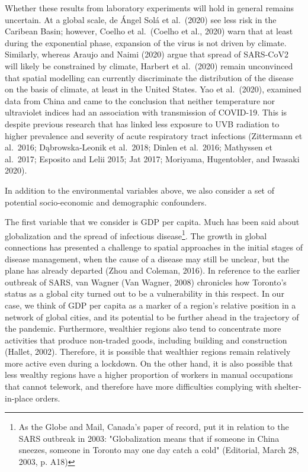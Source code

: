 \documentclass[]{elsarticle} %
\begin{document}
Whether these results from laboratory experiments will hold in general
remains uncertain. At a global scale, de Ángel Solá et al.~(2020) see
less risk in the Caribean Basin; however, Coelho et al.~(Coelho et al.,
2020) warn that at least during the exponential phase, expansion of the
virus is not driven by climate. Similarly, whereas Araujo and Naimi
(2020) argue that spread of SARS-CoV2 will likely be constrained by
climate, Harbert et al.~(2020) remain unconvinced that spatial modelling
can currently discriminate the distribution of the disease on the basis
of climate, at least in the United States. Yao et al.~(2020), examined
data from China and came to the conclusion that neither temperature nor
ultraviolet indices had an association with transmission of COVID-19.
This is despite previous research that has linked less exposure to UVB
radiation to higher prevalence and severity of acute respiratory tract
infections (Zittermann et al.~2016; Dąbrowska-Leonik et al.~2018; Dinlen
et al.~2016; Mathyssen et al.~2017; Esposito and Lelii 2015; Jat 2017;
Moriyama, Hugentobler, and Iwasaki 2020).

In addition to the environmental variables above, we also consider a set
of potential socio-economic and demographic confounders.

The first variable that we consider is GDP per capita. Much has been
said about globalization and the spread of infectious
disease\footnote{As the Globe and Mail, Canada's paper of record, put it in relation to the SARS outbreak in 2003: "Globalization means that if someone in China sneezes, someone in Toronto may one day catch a cold" (Editorial, March 28, 2003, p. A18)}.
The growth in global connections has presented a challenge to spatial
approaches in the initial stages of disease management, when the cause
of a disease may still be unclear, but the plane has already departed
(Zhou and Coleman, 2016). In reference to the earlier outbreak of SARS,
van Wagner (Van Wagner, 2008) chronicles how Toronto's status as a
global city turned out to be a vulnerability in this respect. In our
case, we think of GDP per capita as a marker of a region's relative
position in a network of global cities, and its potential to be further
ahead in the trajectory of the pandemic. Furthermore, wealthier regions
also tend to concentrate more activities that produce non-traded goods,
including building and construction (Hallet, 2002). Therefore, it is
possible that wealthier regions remain relatively more active even
during a lockdown. On the other hand, it is also possible that less
wealthy regions have a higher proportion of workers in manual
occupations that cannot telework, and therefore have more difficulties
complying with shelter-in-place orders.
\end{document}
